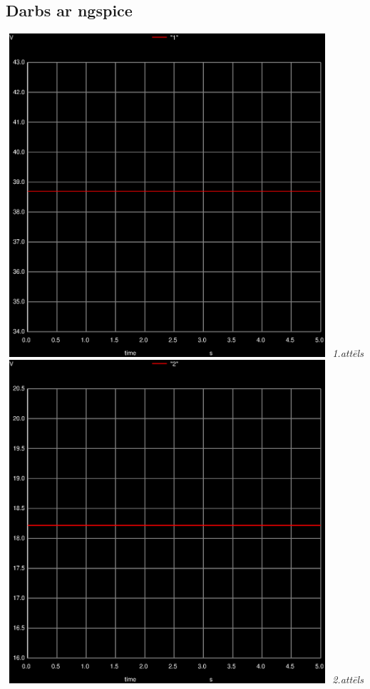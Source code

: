 \documentclass {report}
\begin{document}
\subsection{Darbs ar ngspice}
\begin{center}
    \includegraphics[width=12cm,height=12cm,keepaspectratio]{pictures/011.ps} \textit{1.attēls} \\
    \includegraphics[width=12cm,height=12cm,keepaspectratio]{pictures/012.ps} \textit{2.attēls} \\
\end{center}
\end{document}
